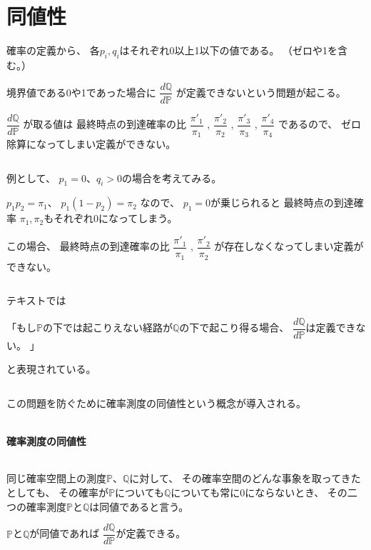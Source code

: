 \documentclass[uplatex,a4j,12pt,dvipdfmx]{jsarticle}
\begin{document}
\section{同値性}

確率の定義から、
各$p_{i},q_{i}$はそれぞれ0以上1以下の値である。
（ゼロや1を含む。）

境界値である0や1であった場合に
$\dfrac{ d \mathbb{Q} }{ d \mathbb{P} }$
が定義できないという問題が起こる。

$\dfrac{ d \mathbb{Q} }{ d \mathbb{P} }$
が取る値は
最終時点の到達確率の比
$\dfrac{ \pi'_{1} }{ \pi_{1} }$
,
$\dfrac{ \pi'_{2} }{ \pi_{2} }$
,
$\dfrac{ \pi'_{3} }{ \pi_{3} }$
,
$\dfrac{ \pi'_{4} }{ \pi_{4} }$
であるので、
ゼロ除算になってしまい定義ができない。

${}$

例として、
$p_{1} = 0$、$q_{i}>0$の場合を考えてみる。

$p_{1} p_{2} = \pi_{1}$、
$p_{1} (1-p_{2}) = \pi_{2}$
なので、
$p_{1} = 0$が乗じられると
最終時点の到達確率
$\pi_{1},\pi_{2}$もそれぞれ0になってしまう。

この場合、
最終時点の到達確率の比
$\dfrac{ \pi'_{1} }{ \pi_{1} }$
,
$\dfrac{ \pi'_{2} }{ \pi_{2} }$
が存在しなくなってしまい定義ができない。

${}$

テキスト\cite{BaxterRennie}では

「もし$\mathbb{P}$の下では起こりえない経路が$\mathbb{Q}$の下で起こり得る場合、
$\dfrac{ d \mathbb{Q} }{ d \mathbb{P} }$は定義できない。
」

と表現されている。

${}$

この問題を防ぐために確率測度の同値性という概念が導入される。

${}$

\paragraph{確率測度の同値性}

${}$

同じ確率空間上の測度$\mathbb{P}$、$\mathbb{Q}$に対して、
その確率空間のどんな事象を取ってきたとしても、
その確率が$\mathbb{P}$についても$\mathbb{Q}$についても常に0にならないとき、
その二つの確率測度$\mathbb{P}$と$\mathbb{Q}$は同値であると言う。
\ \\

${}$

$\mathbb{P}$と$\mathbb{Q}$が同値であれば
$\dfrac{ d \mathbb{Q} }{ d \mathbb{P} }$が定義できる。
\end{document}
